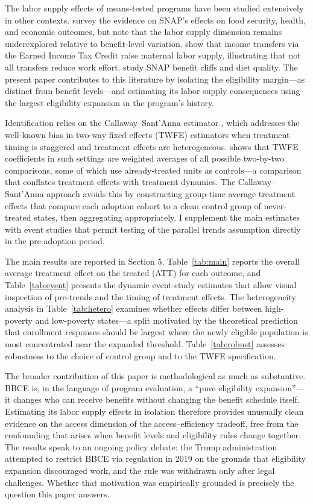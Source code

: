 \documentclass[12pt]{article}
\begin{document}
The labor supply effects of means-tested programs have been studied extensively in other contexts. \citet{hoynes2016snap} survey the evidence on SNAP's effects on food security, health, and economic outcomes, but note that the labor supply dimension remains underexplored relative to benefit-level variation. \citet{dahl2012impact} show that income transfers via the Earned Income Tax Credit raise maternal labor supply, illustrating that not all transfers reduce work effort. \citet{bitler2023snap} study SNAP benefit cliffs and diet quality. The present paper contributes to this literature by isolating the eligibility margin---as distinct from benefit levels---and estimating its labor supply consequences using the largest eligibility expansion in the program's history.

Identification relies on the Callaway--Sant'Anna estimator \citep{callaway2021difference}, which addresses the well-known bias in two-way fixed effects (TWFE) estimators when treatment timing is staggered and treatment effects are heterogeneous. \citet{goodmanbacon2021difference} shows that TWFE coefficients in such settings are weighted averages of all possible two-by-two comparisons, some of which use already-treated units as controls---a comparison that conflates treatment effects with treatment dynamics. The Callaway--Sant'Anna approach avoids this by constructing group-time average treatment effects that compare each adoption cohort to a clean control group of never-treated states, then aggregating appropriately. I supplement the main estimates with event studies that permit testing of the parallel trends assumption directly in the pre-adoption period.

The main results are reported in Section 5. Table~\ref{tab:main} reports the overall average treatment effect on the treated (ATT) for each outcome, and Table~\ref{tab:event} presents the dynamic event-study estimates that allow visual inspection of pre-trends and the timing of treatment effects. The heterogeneity analysis in Table~\ref{tab:hetero} examines whether effects differ between high-poverty and low-poverty states---a split motivated by the theoretical prediction that enrollment responses should be largest where the newly eligible population is most concentrated near the expanded threshold. Table~\ref{tab:robust} assesses robustness to the choice of control group and to the TWFE specification.

The broader contribution of this paper is methodological as much as substantive. BBCE is, in the language of program evaluation, a ``pure eligibility expansion''---it changes who can receive benefits without changing the benefit schedule itself. Estimating its labor supply effects in isolation therefore provides unusually clean evidence on the access dimension of the access--efficiency tradeoff, free from the confounding that arises when benefit levels and eligibility rules change together. The results speak to an ongoing policy debate: the Trump administration attempted to restrict BBCE via regulation in 2019 on the grounds that eligibility expansion discouraged work, and the rule was withdrawn only after legal challenges. Whether that motivation was empirically grounded is precisely the question this paper answers.
\end{document}
